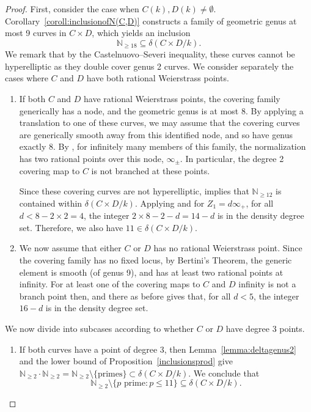\documentclass[a4paper,11pt]{amsart}
\theoremstyle{plain}
\theoremstyle{remark}
\newcommand{\nn}{\mathbb{N}}
\newcommand{\dendegs}{\delta}
\begin{document}
\begin{proof}
First, consider the case when $C(k), D(k)\neq\emptyset$.
Corollary~\ref{coroll:inclusionofN(C,D)} constructs a family of geometric genus at most 9 curves in $C \times D$, which  yields an inclusion 
\[\nn_{\geq 18}\subseteq \dendegs(C\times D/k).\]
We remark that by the Castelnuovo--Severi inequality, these curves cannot be hyperelliptic as they double cover genus 2 curves.
We consider separately the cases where $C$ and $D$ have both rational Weierstrass points.
\begin{enumerate}
    \item[(i)] If both $C$ and $D$ have rational Weierstrass points, the covering family generically has a node, and the geometric genus is at most 8. 
    By applying a translation to one of these curves, we may assume that the covering curves are generically smooth away from this identified node, and so have genus exactly 8. By , for infinitely many members of this family, the normalization has two rational points over this node, $\infty_{\pm}$. In particular, the degree 2 covering map to $C$ is not branched at these points. 
    
    Since these covering curves are not hyperelliptic,  implies that $\nn_{\geq 12}$ is contained within $\dendegs(C \times D / k)$.
    Applying  and  for $Z_1= d\infty_+$, for all $d < 8 - 2\times2 = 4$, the integer $2\times 8 - 2 - d = 14 - d$ is in the density degree set. Therefore, we also have $11\in \delta(C\times D/k)$.

    \item[(ii)] We now assume that either $C$ or $D$ has no rational Weierstrass point. Since the covering family has no fixed locus, by Bertini's Theorem, the generic element is smooth (of genus 9), and has at least two rational points at infinity. 
    For at least one of the covering maps to $C$ and $D$ infinity is not a branch point then, and there as before  gives that, for all $d < 5$, the integer $16 - d$ is in the density degree set.
\end{enumerate}

We now divide into subcases according to whether $C$ or $D$ have degree 3 points.
\begin{enumerate}
    \item If both curves have a point of degree $3$, then Lemma~\ref{lemma:deltagenus2} and the lower bound of Proposition~\ref{inclusionsprod} give $\nn_{\geq 2}\cdot\nn_{\geq 2}=\nn_{\geq 2} \setminus\{\text{primes}\} \subset \dendegs(C\times D/k)$. 
    We conclude that 
    \[\nn_{\geq 2} \setminus \{p \text{ prime} : p\leq 11\}\subseteq\dendegs(C\times D/k).\]
    

\end{enumerate}
\end{proof}
\end{document}
